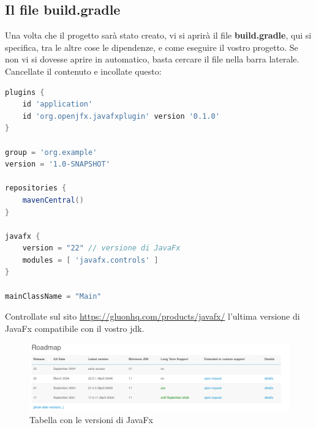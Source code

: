     \subsection{Il file build.gradle}
    Una volta che il progetto sarà stato creato, vi si aprirà il file \textbf{build.gradle}, qui si specifica, tra le altre cose le dipendenze, 
    e come eseguire il vostro progetto. Se non vi si dovesse aprire in automatico, basta cercare il file nella barra laterale. Cancellate il 
    contenuto e incollate questo:
    \begin{ret}
        \begin{lstlisting}[language=Groovy]
plugins {
    id 'application'
    id 'org.openjfx.javafxplugin' version '0.1.0'
}

group = 'org.example'
version = '1.0-SNAPSHOT'

repositories {
    mavenCentral()
}

javafx {
    version = "22" // versione di JavaFx
    modules = [ 'javafx.controls' ]
}

mainClassName = "Main"
        \end{lstlisting}
    \end{ret}
    \begin{warningbox}
        Controllate sul sito \url{https://gluonhq.com/products/javafx/} l'ultima versione di JavaFx compatibile con il vostro jdk.
    \end{warningbox}
    \begin{figure}[H]
        \centering
        \graphicspath{{src/capitoli/05/img/}}
        \includegraphics[width=\textwidth]{javafx_versions.png}
        \caption{Tabella con le versioni di JavaFx}
        \label{fig:Tabella con le versioni di JavaFx}
    \end{figure}    

